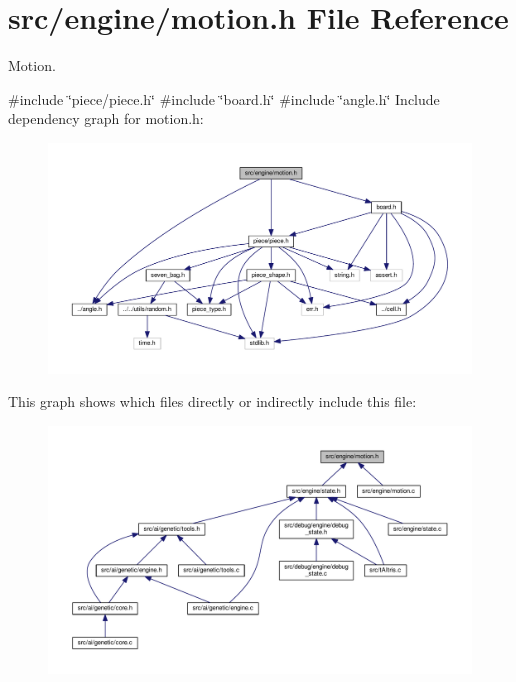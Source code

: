 \section{src/engine/motion.h File Reference}
\label{motion_8h}


Motion.  


{\ttfamily \#include \char`\"{}piece/piece.\+h\char`\"{}}\newline
{\ttfamily \#include \char`\"{}board.\+h\char`\"{}}\newline
{\ttfamily \#include \char`\"{}angle.\+h\char`\"{}}\newline
Include dependency graph for motion.\+h\+:
\nopagebreak
\begin{figure}[H]
\begin{center}
\leavevmode
\includegraphics[width=350pt]{motion_8h__incl}
\end{center}
\end{figure}
This graph shows which files directly or indirectly include this file\+:
\nopagebreak
\begin{figure}[H]
\begin{center}
\leavevmode
\includegraphics[width=350pt]{motion_8h__dep__incl}
\end{center}
\end{figure}

